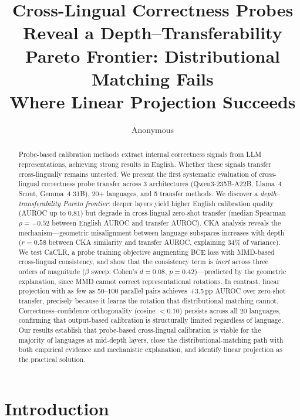 \documentclass[11pt,a4paper]{article}
\title{Cross-Lingual Correctness Probes Reveal a Depth--Transferability\\Pareto Frontier: Distributional Matching Fails\\Where Linear Projection Succeeds}
\author{Anonymous}
\begin{document}
\maketitle

\begin{abstract}
Probe-based calibration methods extract internal correctness signals from LLM representations, achieving strong results in English. Whether these signals transfer cross-lingually remains untested. We present the first systematic evaluation of cross-lingual correctness probe transfer across 3 architectures (Qwen3-235B-A22B, Llama~4 Scout, Gemma~4 31B), 20+ languages, and 5 transfer methods. We discover a \emph{depth--transferability Pareto frontier}: deeper layers yield higher English calibration quality (AUROC up to 0.81) but degrade in cross-lingual zero-shot transfer (median Spearman $\rho = -0.52$ between English AUROC and transfer AUROC). CKA analysis reveals the mechanism---geometric misalignment between language subspaces increases with depth ($r = 0.58$ between CKA similarity and transfer AUROC, explaining 34\% of variance). We test CaCLR, a probe training objective augmenting BCE loss with MMD-based cross-lingual consistency, and show that the consistency term is \emph{inert} across three orders of magnitude ($\beta$ sweep: Cohen's $d = 0.08$, $p = 0.42$)---predicted by the geometric explanation, since MMD cannot correct representational rotations. In contrast, linear projection with as few as 50--100 parallel pairs achieves +3.5\,pp AUROC over zero-shot transfer, precisely because it learns the rotation that distributional matching cannot. Correctness--confidence orthogonality (cosine $< 0.10$) persists across all 20 languages, confirming that output-based calibration is structurally limited regardless of language. Our results establish that probe-based cross-lingual calibration is viable for the majority of languages at mid-depth layers, close the distributional-matching path with both empirical evidence and mechanistic explanation, and identify linear projection as the practical solution.
\end{abstract}

\section{Introduction}
\label{sec:intro}
\end{document}
